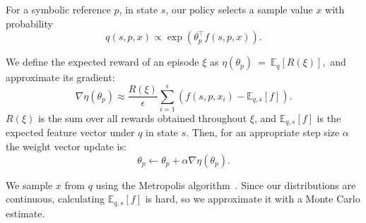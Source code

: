 For a symbolic reference $p$, in state $s$, our policy selects a
sample value $x$ with probability
$$q(s, p, x) \propto \exp(\theta_{p}^{\top} f(s, p, x)).$$

We define the expected reward of an episode $\xi$ as
$\eta(\theta_{p})~=~\mathbb{E}_{q}[R(\xi)],$ and approximate its
gradient:
$$\nabla \eta(\theta_{p}) \approx \frac{R(\xi)}{\epsilon}
\sum_{i=1}^{\epsilon}(f(s, p, x_{i}) - \mathbb{E}_{q,s}[f]).$$
$R(\xi)$ is the sum over all rewards obtained throughout $\xi$, and
$\mathbb{E}_{q,s}[f]$ is the expected feature vector under $q$ in
state $s$. Then, for an appropriate step size $\alpha$ the weight
vector update is:
$$\theta_{p} \leftarrow \theta_{p} + \alpha \nabla \eta(\theta_{p}).$$

We sample $x$ from $q$ using the Metropolis algorithm~\cite{chib1995understanding}.
Since our distributions are continuous, calculating $\mathbb{E}_{q,s}[f]$ is hard,
so we approximate it with a Monte Carlo estimate.
